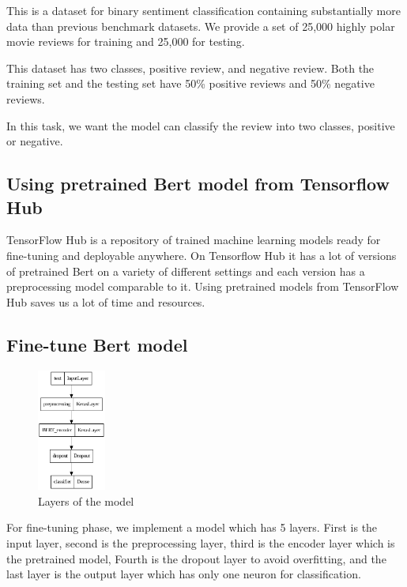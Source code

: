 \documentclass[11pt]{article}
\begin{document}
\quad This is a dataset for binary sentiment classification containing substantially more data than previous benchmark datasets. We provide a set of 25,000 highly polar movie reviews for training and 25,000 for testing. 

This dataset has two classes, positive review, and negative review. Both the training set and the testing set have 50\% positive reviews and 50\% negative reviews.


In this task, we want the model can classify the review into two classes, positive or negative.

\subsection{ Using pretrained Bert model from Tensorflow Hub}

\quad TensorFlow Hub is a repository of trained machine learning models ready for fine-tuning and deployable anywhere. On Tensorflow Hub it has a lot of versions of pretrained Bert on a variety of different settings and each version has a preprocessing model comparable to it. Using pretrained models from TensorFlow Hub saves us a lot of time and resources.

\subsection{Fine-tune Bert model}

\begin{figure}[h]
	\centering
	\includegraphics[width=0.2\textwidth]{b-cls-model.png}
	\caption{Layers of the model}
	\label{fig1}
\end{figure}

For fine-tuning phase, we implement a model which has 5 layers. First is the input layer, second is the preprocessing layer, third is the encoder layer which is the pretrained model, Fourth is the dropout layer to avoid overfitting, and the last layer is the output layer which has only one neuron for classification.
\end{document}
